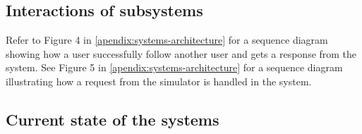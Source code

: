 \subsection{Interactions of subsystems}
Refer to Figure 4 in \ref{apendix:systems-architecture} for a sequence diagram showing how a user successfully follow another user and gets a response from the system. See Figure 5 in \ref{apendix:systems-architecture} for a sequence diagram illustrating how a request from the simulator is handled in the system.

\subsection{Current state of the systems}
